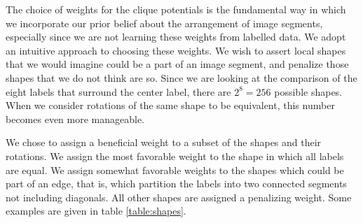\documentclass[12pt]{article}
\begin{document}
The choice of weights for the clique potentials is the fundamental way in which
we incorporate our prior belief about the arrangement of image segments,
especially since we are not learning these weights from labelled data. We adopt
an intuitive approach to choosing these weights. We wish to assert local shapes
that we would imagine could be a part of an image segment, and penalize those
shapes that we do not think are so. Since we are looking at the comparison of
the eight labels that surround the center label, there are $2^8 = 256$ possible
shapes. When we consider rotations of the same shape to be equivalent, this
number becomes even more manageable.

We chose to assign a beneficial weight to a subset of the shapes and their
rotations. We assign the most favorable weight to the shape in which all labels
are equal. We assign somewhat favorable weights to the shapes which could be
part of an edge, that is, which partition the labels into two connected
segments not including diagonals. All other shapes are assigned a penalizing
weight. Some examples are given in table \ref{table:shapes}.
\end{document}
